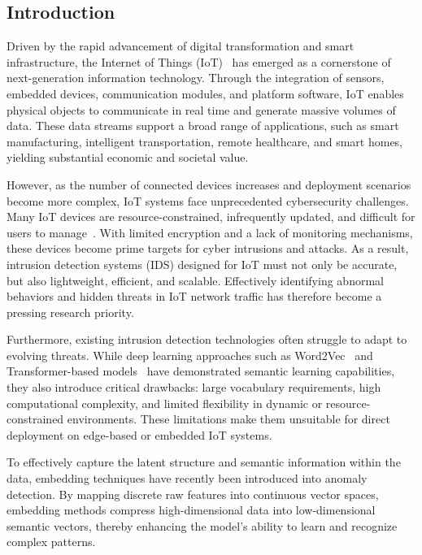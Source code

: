 \begin{ZhChapter}
    \chapter{Introduction}
    Driven by the rapid advancement of digital transformation and smart infrastructure, the Internet of Things (IoT)~\cite{atzori2010internet} has emerged as a cornerstone of next-generation information technology. Through the integration of sensors, embedded devices, communication modules, and platform software, IoT enables physical objects to communicate in real time and generate massive volumes of data. These data streams support a broad range of applications, such as smart manufacturing, intelligent transportation, remote healthcare, and smart homes, yielding substantial economic and societal value.

    However, as the number of connected devices increases and deployment scenarios become more complex, IoT systems face unprecedented cybersecurity challenges. Many IoT devices are resource-constrained, infrequently updated, and difficult for users to manage~\cite{8300305}. With limited encryption and a lack of monitoring mechanisms, these devices become prime targets for cyber intrusions and attacks. As a result, intrusion detection systems (IDS) designed for IoT must not only be accurate, but also lightweight, efficient, and scalable. Effectively identifying abnormal behaviors and hidden threats in IoT network traffic has therefore become a pressing research priority.

    Furthermore, existing intrusion detection technologies often struggle to adapt to evolving threats. While deep learning approaches such as Word2Vec~\cite{church2017word2vec} and Transformer-based models~\cite{han2022survey} have demonstrated semantic learning capabilities, they also introduce critical drawbacks: large vocabulary requirements, high computational complexity, and limited flexibility in dynamic or resource-constrained environments. These limitations make them unsuitable for direct deployment on edge-based or embedded IoT systems.

    To effectively capture the latent structure and semantic information within the data, embedding techniques have recently been introduced into anomaly detection. By mapping discrete raw features into continuous vector spaces, embedding methods compress high-dimensional data into low-dimensional semantic vectors, thereby enhancing the model's ability to learn and recognize complex patterns.


\end{ZhChapter}
